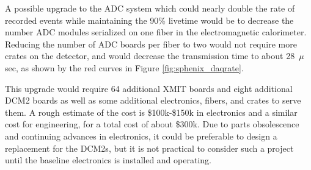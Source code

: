 A possible upgrade to the ADC system which could nearly double the
rate of recorded events while maintaining the 90\% livetime would be
to decrease the number ADC modules serialized on one fiber in the
electromagnetic calorimeter.  Reducing the number of ADC boards per
fiber to two would not require more crates on the detector, and would
decrease the transmission time to about 28~$\mu$sec, as shown by the
red curves in Figure \ref{fig:sphenix_daqrate}.

This upgrade would require 64 additional XMIT boards and eight
additional DCM2 boards as well as some additional electronics, fibers,
and crates to serve them.  A rough estimate of the cost is
\$100k-\$150k in electronics and a similar cost for engineering, for a
total cost of about \$300k.  Due to parts obsolescence and continuing
advances in electronics, it could be preferable to design a
replacement for the DCM2s, but it is not practical to consider such a
project until the baseline electronics is installed and operating.



